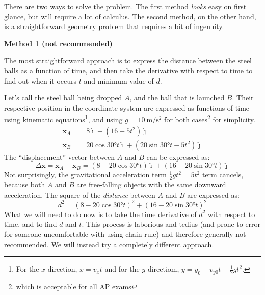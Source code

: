 \documentclass[11pt]{article}
\newcommand{\mb}[1]{\mathbf{#1}}
\newcommand{\iii}{\bm{\hat{\imath}}}
\newcommand{\jjj}{\bm{\hat{\jmath}}}
\begin{document}

There are two ways to solve the problem. The first method \emph{looks} easy on
first glance, but will require a lot of calculus. The second method, on the
other hand, is a straightforward geometry problem that requires a bit of
ingenuity.

\textbf{\underline{Method 1 (not recommended)}}

The most straightforward approach is to express the distance between the steel
balls as a function of time, and then take the derivative with respect to time
to find out when it occurs $t$ and minimum value of $d$.

Let's call the steel ball being dropped $A$, and the ball that is launched
$B$. Their respective position in the coordinate system are expressed as
functions of time using kinematic equations\footnote{For the $x$ direction,
  $x=v_xt$ and for the $y$ directiom, $y=y_0+v_{y0}t-\frac12gt^2$.}, and using
$g=\SI{10}{\metre\per\second^2}$ for both cases\footnote{which is acceptable
  for all AP exams} for simplicity.
\begin{align}
  \mb{x}_A &= 8\iii + (16-5t^2)\jjj \\
  \mb{x}_B &=20\cos\ang{30}t\iii+(20\sin\ang{30}t-5t^2)\jjj
\end{align}
The ``displacement'' vector between $A$ and $B$ can be expressed as:
\begin{equation}
  \Delta\mb{x}
  =\mb{x}_A-\mb{x}_B
  =(8-20\cos\ang{30}t)\iii + (16-20\sin\ang{30}t)\jjj
  \label{no-g}
\end{equation}
Not surprisingly, the gravitational acceleration term $\frac12gt^2=5t^2$ term
cancels, because both $A$ and $B$ are free-falling objects with the same
downward acceleration. The square of the \emph{distance} between $A$ and $B$ are
expressed as:
\begin{equation}
  d^2 =(8-20\cos\ang{30}t)^2 + (16-20\sin\ang{30}t)^2
\end{equation}
What we will need to do now is to take the time derivative of $d^2$ with
respect to time, and to find $d$ and $t$. This process is laborious and
tedius (and prone to error for someone uncomfortable with using chain rule)
and therefore generally not recommended. We will instead try a completely
different approach.
\end{document}
